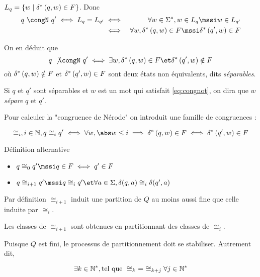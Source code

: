 \begin{rappel}
	$L_q = \left\{w \mid \delta^{*} \left(q,w\right) \in F\right\}$.
	Donc
	\begin{eqnarray*}
		q \ \congN \ q' \iff L_q = L_{q'} &\iff& \forall w \in \mots, w \in L_q \mssi w \in L_{q'} \\
		&\iff& \forall w, \deltaS q w \in F \mssi  \deltaS {q'} w \in F
	\end{eqnarray*}

	On en déduit que
	\begin{equation}\label{eq:congnot}
        q \ \not{\congN} \ q' \iff \exists w, \deltaS q w \in F \et \deltaS {q'} w \notin F
	\end{equation}
	où $\delta^{*} \left(q,w\right) \notin F$ et $\delta^{*} \left(q',w\right) \in F$ sont deux états non équivalents, dits \emph{séparables}.
\end{rappel}

Si $q$ et $q'$ sont séparables et $w$ est un mot qui satisfait \ref{eq:congnot}, on dira que $w$ \emph{sépare} $q$ et $q'$.


Pour calculer la "congruence de Nérode" on introduit une famille de congruences :

\begin{equation*}
	\cong_i, i  \in \N, q \cong_i q' \iff \forall w, \abs w \leq i \implies \deltaS q w \in F \iff  \deltaS {q'} w \in F
\end{equation*}


\begin{definition}
	Définition alternative

	\begin{itemize}
		\item $q \cong_0 q' \mssi q\in F \iff q' \in F$
		\item $q \cong_{i+1} q' \mssi q \cong_{i} q' \et  \forall a \in \alphabet, \delta (q,a) \cong_i \delta (q', a)$
	\end{itemize}
\end{definition}

\begin{remarque}
	Par définition $\cong_{i+1}$ induit une partition de $Q$ au moins aussi fine que celle induite par $\cong_i$.

	Les classes de $\cong_{i+1}$ sont obtenues en partitionnant des classes de $\cong_i$.
\end{remarque}

\begin{remarque}
	Puisque $Q$ est fini, le processus de partitionnement doit se stabiliser. Autrement dit,

	$$\exists k \in \mathbb{N}^*, \text{tel que } \cong_{k} \ = \ \cong_{k+j} \forall j \in \mathbb{N}^* $$
\end{remarque}


